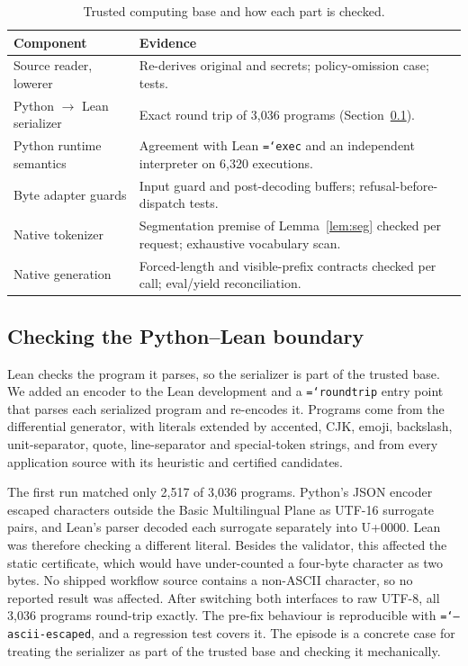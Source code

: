 \documentclass[preprint,12pt]{elsarticle}
\theoremstyle{definition}
\newcommand{\code}[1]{\texttt{\hyphenchar\font=`\-#1}}
\begin{document}
\begin{table}[t]
\centering\footnotesize
\caption{Trusted computing base and how each part is checked.}
\label{tab:tcb}
\begin{tabular}{p{35mm}p{90mm}}\toprule
Component & Evidence\\\midrule
Source reader, lowerer & Re-derives original and secrets; policy-omission case; tests.\\
Python $\to$ Lean serializer & Exact round trip of 3,036 programs (Section~\ref{sec:impl-boundary}).\\
Python runtime semantics & Agreement with Lean \code{exec} and an independent interpreter on 6,320 executions.\\
Byte adapter guards & Input guard and post-decoding buffers; refusal-before-dispatch tests.\\
Native tokenizer & Segmentation premise of Lemma~\ref{lem:seg} checked per request; exhaustive vocabulary scan.\\
Native generation & Forced-length and visible-prefix contracts checked per call; eval/yield reconciliation.\\\bottomrule
\end{tabular}
\end{table}

\subsection{Checking the Python--Lean boundary}\label{sec:impl-boundary}

Lean checks the program it parses, so the serializer is part of the trusted base.
We added an encoder to the Lean development and a \code{roundtrip} entry point that
parses each serialized program and re-encodes it. Programs come from the
differential generator, with literals extended by accented, CJK, emoji, backslash,
unit-separator, quote, line-separator and special-token strings, and from every
application source with its heuristic and certified candidates.

The first run matched only 2,517 of 3,036 programs. Python's JSON encoder escaped
characters outside the Basic Multilingual Plane as UTF-16 surrogate pairs, and
Lean's parser decoded each surrogate separately into U+0000. Lean was therefore
checking a different literal. Besides the validator, this affected the static
certificate, which would have under-counted a four-byte character as two bytes.
No shipped workflow source contains a non-ASCII character, so no reported result
was affected. After switching both interfaces to raw UTF-8, all 3,036 programs
round-trip exactly. The pre-fix behaviour is reproducible with
\code{--ascii-escaped}, and a regression test covers it. The episode is a concrete
case for treating the serializer as part of the trusted base and checking it
mechanically.
\end{document}

